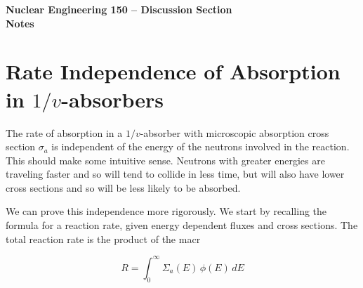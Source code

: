 \documentclass{report}
\begin{document}
\begin{center}
\textbf{\large Nuclear Engineering 150 -- Discussion Section}\\ 
\textbf{Notes}
\end{center}


\section*{Rate Independence of Absorption in $1/v$-absorbers} 

The rate of absorption in a $1/v$-absorber with microscopic absorption cross section $\sigma_a$ is independent of the energy of the neutrons involved in the reaction. This should make some intuitive sense. Neutrons with greater energies are traveling faster and so will tend to collide in less time, but will also have lower cross sections and so will be less likely to be absorbed. 

We can prove this independence more rigorously. We start by recalling the formula for a reaction rate, given energy dependent fluxes and cross sections. The total reaction rate is the product of the macr

$$ R = \int_0^{\infty} \Sigma_a(E) \, \phi(E) \, dE $$
\end{document}
